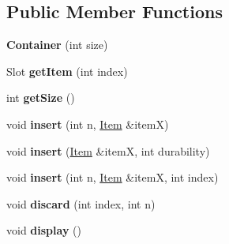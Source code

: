\subsection*{Public Member Functions}
\begin{DoxyCompactItemize}
\item 
\mbox{\label{classContainer_a3cffc4a781ade773f436ac8d7e93ea1f}} 
{\bfseries Container} (int size)
\item 
\mbox{\label{classContainer_a2380b9e12e08f17ad1d97607b87e16be}} 
Slot {\bfseries get\+Item} (int index)
\item 
\mbox{\label{classContainer_a8f17aec1ba74eb14336624b2141c4ba3}} 
int {\bfseries get\+Size} ()
\item 
\mbox{\label{classContainer_a3abf81a8cce653a85ce6073c511d79a2}} 
void {\bfseries insert} (int n, \hyperlink{classItem}{Item} \&itemX)
\item 
\mbox{\label{classContainer_a34218839d4c35dd9ccc101d4eb71f7aa}} 
void {\bfseries insert} (\hyperlink{classItem}{Item} \&itemX, int durability)
\item 
\mbox{\label{classContainer_a328733f18186b3fcca0c787745193c24}} 
void {\bfseries insert} (int n, \hyperlink{classItem}{Item} \&itemX, int index)
\item 
\mbox{\label{classContainer_adccb8b9e861e6710c4d08d348245662f}} 
void {\bfseries discard} (int index, int n)
\item 
\mbox{\label{classContainer_a84ae6595aef25e44a4786b0d2bd2c172}} 
void {\bfseries display} ()
\end{DoxyCompactItemize}

